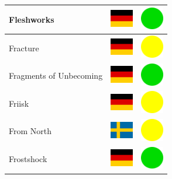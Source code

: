\documentclass[12pt, a4paper, twoside]{report}
\begin{document}
\begin{center}
\begin{longtable}{|p{5cm}|p{2cm}|p{2cm}|}
 Fleshworks                                                 & \includegraphics[width=1cm]{../img/flags/de} &   \includegraphics[width=1cm]{../likes/y} \\ \hline
 Fracture                                                   & \includegraphics[width=1cm]{../img/flags/de} &   \includegraphics[width=1cm]{../likes/m} \\ \hline
 Fragments of Unbecoming                                    & \includegraphics[width=1cm]{../img/flags/de} &   \includegraphics[width=1cm]{../likes/y} \\ \hline
 Friisk                                                     & \includegraphics[width=1cm]{../img/flags/de} &   \includegraphics[width=1cm]{../likes/m} \\ \hline
 From North                                                 & \includegraphics[width=1cm]{../img/flags/se} &   \includegraphics[width=1cm]{../likes/m} \\ \hline
 Frostshock                                                 & \includegraphics[width=1cm]{../img/flags/de} &   \includegraphics[width=1cm]{../likes/y} \\ \hline

\end{longtable}
\end{center}
\end{document}
